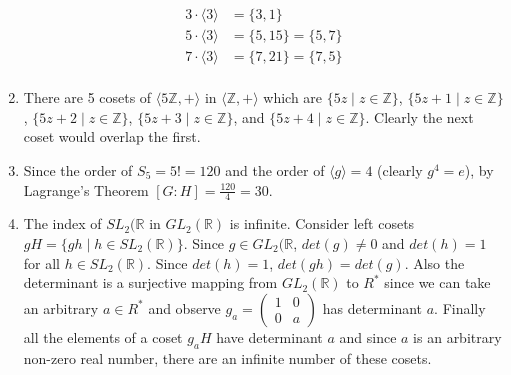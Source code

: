 \documentclass{amsart}
\begin{document}
\begin{enumerate}
\begin{align*}
        3\cdot \langle 3 \rangle&=\{3,1\} \\
        5\cdot \langle 3 \rangle&=\{5,15\}=\{5,7\} \\
        7\cdot \langle 3 \rangle&=\{7,21\}=\{7,5\} \\
    \end{align*}
    \item There are 5 cosets of $\langle 5\mathbb{Z}, + \rangle$ in $\langle \mathbb{Z},+ \rangle$ which are $\{5z\mid z\in\mathbb{Z}\}$, $\{5z+1\mid z\in\mathbb{Z}\}$, $\{5z+2\mid z\in\mathbb{Z}\}$, $\{5z+3\mid z\in\mathbb{Z}\}$, and $\{5z+4\mid z\in\mathbb{Z}\}$.  Clearly the next coset would overlap the first.
    \item Since the order of $S_5=5!=120$ and the order of $\langle g \rangle=4$ (clearly $g^4=e$), by Lagrange's Theorem $[G:H]=\frac{120}{4}=30$.
    \item The index of $SL_2(\mathbb{R}$ in $GL_2(\mathbb{R})$ is infinite.  Consider left cosets $gH=\{gh\mid h\in SL_2(\mathbb{R})\}$.  Since $g\in GL_2(\mathbb{R}$, $det(g)\neq 0$ and $det(h)=1$ for all $h\in SL_2(\mathbb{R})$.  Since $det(h)=1$, $det(gh)=det(g)$.  Also the determinant is a surjective mapping from $GL_2(\mathbb{R})$ to $R^*$ since we can take an arbitrary $a\in R^*$ and observe $g_a=\left( \begin{array}{cc} 1 & 0 \\ 0 & a\end{array}\right)$ has determinant $a$.  Finally all the elements of a coset $g_aH$  have determinant $a$ and since $a$ is an arbitrary non-zero real number, there are an infinite number of these cosets.
\end{enumerate}
\end{document}
